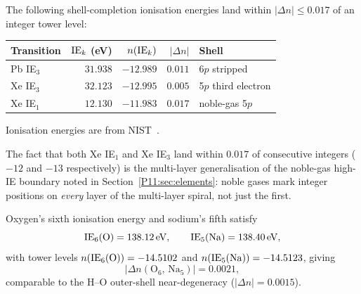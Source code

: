\begin{proposition}
\label{P11:prop:shell_completion}
The following shell-completion ionisation energies land within
$|\Delta n|\leq 0.017$ of an integer tower level:
\begin{center}
\begin{tabular}{lrrrl}
\toprule
Transition & $\mathrm{IE}_k$ (eV) & $n\!\left(\mathrm{IE}_k\right)$ & $|\Delta n|$ & Shell \\
\midrule
Pb  IE$_3$   & $31.938$ & $-12.989$ & $0.011$ & 6$p$ stripped \\
Xe  IE$_3$   & $32.123$ & $-12.995$ & $0.005$ & 5$p$ third electron \\
Xe  IE$_1$   & $12.130$ & $-11.983$ & $0.017$ & noble-gas 5$p$ \\
\bottomrule
\end{tabular}
\end{center}
Ionisation energies are from NIST~\cite{NIST_ASD}.
\end{proposition}

\begin{remark}
\label{P11:rem:xenon_anchor}
The fact that both Xe IE$_1$ and Xe IE$_3$ land within $0.017$ of
consecutive integers ($-12$ and $-13$ respectively) is the multi-layer
generalisation of the noble-gas high-IE boundary noted in
Section~\ref{P11:sec:elements}: noble gases mark integer positions on
\emph{every} layer of the multi-layer spiral, not just the first.
\end{remark}

\begin{proposition}
\label{P11:prop:inner_degen}
Oxygen's sixth ionisation energy and sodium's fifth satisfy
\begin{equation}
  \mathrm{IE}_6(\mathrm{O}) = 138.12\,\mathrm{eV},
  \qquad
  \mathrm{IE}_5(\mathrm{Na}) = 138.40\,\mathrm{eV},
  \label{P11:eq:inner_IEs}
\end{equation}
with tower levels $n\!\left(\mathrm{IE}_6(\mathrm{O})\right)=-14.5102$ and
$n\!\left(\mathrm{IE}_5(\mathrm{Na})\right)=-14.5123$, giving
\begin{equation}
  |\Delta n(\mathrm{O}_6,\,\mathrm{Na}_5)| = 0.0021,
  \label{P11:eq:inner_degen_val}
\end{equation}
comparable to the H--O outer-shell near-degeneracy ($|\Delta n|=0.0015$).
\end{proposition}

